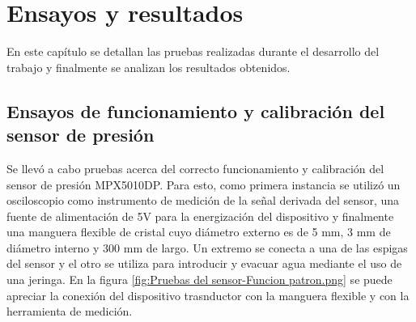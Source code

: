 
\chapter{Ensayos y resultados} %

\label{Chapter4} %

En este capítulo se detallan las pruebas realizadas durante el desarrollo del trabajo y finalmente se analizan los resultados obtenidos.
\section{Ensayos de funcionamiento y calibración del sensor de presión
}
\label{sec:Ensayos de funcionamiento y calibración del sensor de presión
}
Se llevó a cabo pruebas acerca del correcto funcionamiento y calibración del sensor de presión MPX5010DP. Para esto, como primera instancia se utilizó un osciloscopio como instrumento de medición de la señal derivada del sensor, una fuente de alimentación de 5V para la energización del dispositivo y finalmente una manguera flexible de cristal cuyo diámetro externo es de 5 mm, 3 mm de diámetro interno y 300 mm de largo. Un extremo se conecta a una de las espigas del sensor y el otro se utiliza para introducir y evacuar agua mediante el uso de una jeringa. En la figura \ref{fig:Pruebas del sensor-Funcion patron.png} se puede apreciar la conexión del dispositivo trasnductor con la manguera flexible y con la herramienta de medición.    

